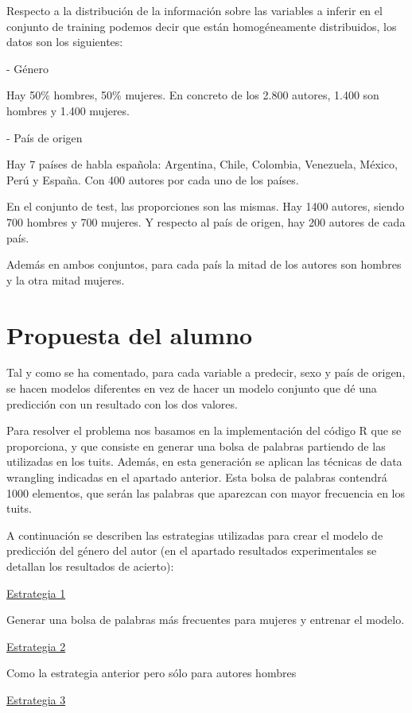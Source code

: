 \documentclass[11pt,a4paper]{article}
\begin{document}
Respecto a la distribución de la información sobre las variables a inferir en el conjunto de training podemos decir que están homogéneamente distribuidos, los datos son los siguientes:

- Género 

Hay 50\% hombres, 50\% mujeres. En concreto de los 2.800 autores,  1.400 son hombres y 1.400 mujeres.

- País de origen

Hay 7 países de habla española: Argentina, Chile, Colombia, Venezuela, México, Perú y España. Con 400 autores por cada uno de los países.



En el conjunto de test, las proporciones son las mismas. Hay 1400 autores, siendo 700 hombres y 700 mujeres. Y respecto al país de origen, hay 200 autores de cada país.

Además en ambos conjuntos, para cada país la mitad de los autores son hombres y la otra mitad mujeres.


\section{Propuesta del alumno}

Tal y como se ha comentado, para cada variable a predecir, sexo y país de origen, se hacen modelos diferentes en vez de hacer un modelo conjunto que dé una predicción con un resultado con los dos valores.

Para resolver el problema nos basamos en la implementación del código R que se proporciona, y que consiste en generar una bolsa de palabras partiendo de las utilizadas en los tuits. Además, en esta generación se aplican las técnicas de data wrangling indicadas en el apartado anterior. Esta bolsa de palabras contendrá 1000 elementos, que serán las palabras que aparezcan con mayor frecuencia en los tuits. 

A continuación se describen las estrategias utilizadas para crear el modelo de predicción del género del autor (en el apartado resultados experimentales se detallan los resultados de acierto):

\underline{Estrategia 1}

Generar una bolsa de palabras más frecuentes para mujeres y entrenar el modelo.

\underline{Estrategia 2}

Como la estrategia anterior pero sólo para autores hombres

\underline{Estrategia 3}
\end{document}
